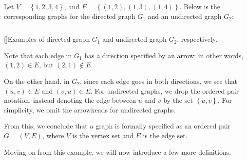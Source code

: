 \documentclass[openany]{book}
\begin{document}
\begin{example}
	Let $V = \left\{  1,2,3,4\right\}$, and $E = \left\{  (1,2), (1,3), (1,4)\right\}$. Below is the corresponding graphs for the directed graph $G_{1}$ and an undirected graph $G_{2}$:
	\begin{center}
		$\qquad\qquad$
	\end{center}
	[]{Examples of directed graph $G_{1}$ and undirected graph $G_{2}$, respectively.}
	
	Note that each edge in $G_{1}$ has a direction specified by an arrow; in other words, $(1,2) \in E$, but $(2,1) \not\in E$.
	
	On the other hand, in $G_{2}$, since each edge goes in both directions, we see that $(u,v) \in E$ and $(v,u) \in E$. For undirected graphs, we drop the ordered pair notation, instead denoting the edge between $u$ and $v$ by the set $\left\{  u, v\right\}$. For simplicity, we omit the arrowheads for undirected graphs.
\end{example}

From this, we conclude that a graph is formally specified as an ordered pair $G = (V,E)$, where $V$ is the vertex set and $E$ is the edge set.

Moving on from this example, we will now introduce a few more definitions.
\end{document}

